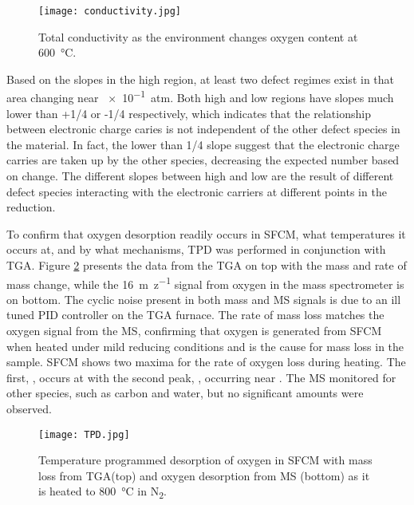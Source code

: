     \begin{figure}
      \texttt{[image: conductivity.jpg]}
      \caption{Total conductivity as the environment changes oxygen content at \SI{600}{\celsius}.}
      \label{fig:conductivity}
    \end{figure}

    Based on the slopes in the high  region, at least two defect regimes exist in that area changing near \SI{e-1}{atm}.
    Both high and low  regions have slopes much lower than +1/4 or -1/4 respectively, which indicates that the relationship between electronic charge caries is not independent of the other defect species in the material.
    In fact, the lower than 1/4 slope suggest that the electronic charge carries are taken up by the other species, decreasing the expected number based on  change.
    The different slopes between high and low  are the result of different defect species interacting with the electronic carriers at different points in the reduction.

    To confirm that oxygen desorption readily occurs in SFCM, what temperatures it occurs at, and by what mechanisms, TPD was performed in conjunction with TGA.
    Figure \ref{fig:TPD} presents the data from the TGA on top with the mass and rate of mass change, while the \SI{16}{m\per z} signal from oxygen in the mass spectrometer is on bottom.
    The cyclic noise present in both mass and MS signals is due to an ill tuned PID controller on the TGA furnace.
    The rate of mass loss matches the oxygen signal from the MS, confirming that oxygen is generated from SFCM when heated under mild reducing conditions and is the cause for mass loss in the sample.
    SFCM shows two maxima for the rate of oxygen loss during heating.
    The first, \textalpha, occurs at  with the second peak, \textbeta, occurring near .
    The MS monitored for other species, such as carbon and water, but no significant amounts were observed.

    \begin{figure}
      \texttt{[image: TPD.jpg]}
      \caption{Temperature programmed desorption of oxygen in SFCM with mass loss from TGA(top) and oxygen desorption from MS (bottom) as it is heated to \SI{800}{\celsius} in N\textsubscript{2}.}
      \label{fig:TPD}
    \end{figure}

